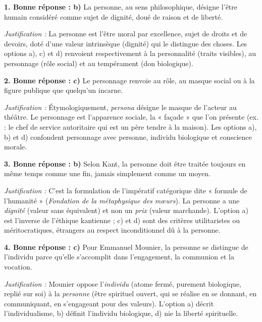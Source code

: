 \documentclass[11pt]{article}
\newcommand{\cle}[1]{{\popxbold\color{popdark}#1}}
\begin{document}
\begin{corrige}
\textbf{1. Bonne réponse : b)} La \cle{personne}, au sens philosophique, désigne l'être humain considéré comme sujet de dignité, doué de raison et de liberté.
\par \textit{Justification :} La personne est l'être moral par excellence, sujet de droits et de devoirs, doté d'une valeur intrinsèque (dignité) qui le distingue des choses. Les options a), c) et d) renvoient respectivement à la personnalité (traits visibles), au personnage (rôle social) et au tempérament (don biologique).

\textbf{2. Bonne réponse : c)} Le \cle{personnage} renvoie au rôle, au masque social ou à la figure publique que quelqu'un incarne.
\par \textit{Justification :} Étymologiquement, \emph{persona} désigne le masque de l'acteur au théâtre. Le personnage est l'apparence sociale, la « façade » que l'on présente (ex. : le chef de service autoritaire qui est un père tendre à la maison). Les options a), b) et d) confondent personnage avec personne, individu biologique et conscience morale.

\textbf{3. Bonne réponse : b)} Selon Kant, la personne doit être traitée toujours en même temps comme une fin, jamais simplement comme un moyen.
\par \textit{Justification :} C'est la formulation de l'impératif catégorique dite « formule de l'humanité » (\emph{Fondation de la métaphysique des mœurs}). La personne a une \emph{dignité} (valeur sans équivalent) et non un \emph{prix} (valeur marchande). L'option a) est l'inverse de l'éthique kantienne ; c) et d) sont des critères utilitaristes ou méritocratiques, étrangers au respect inconditionnel dû à la personne.

\textbf{4. Bonne réponse : c)} Pour Emmanuel Mounier, la personne se distingue de l'individu parce qu'elle s'accomplit dans l'engagement, la communion et la vocation.
\par \textit{Justification :} Mounier oppose l'\emph{individu} (atome fermé, purement biologique, replié sur soi) à la \emph{personne} (être spirituel ouvert, qui se réalise en se donnant, en communiquant, en s'engageant pour des valeurs). L'option a) décrit l'individualisme, b) définit l'individu biologique, d) nie la liberté spirituelle.
\end{corrige}
\end{document}
